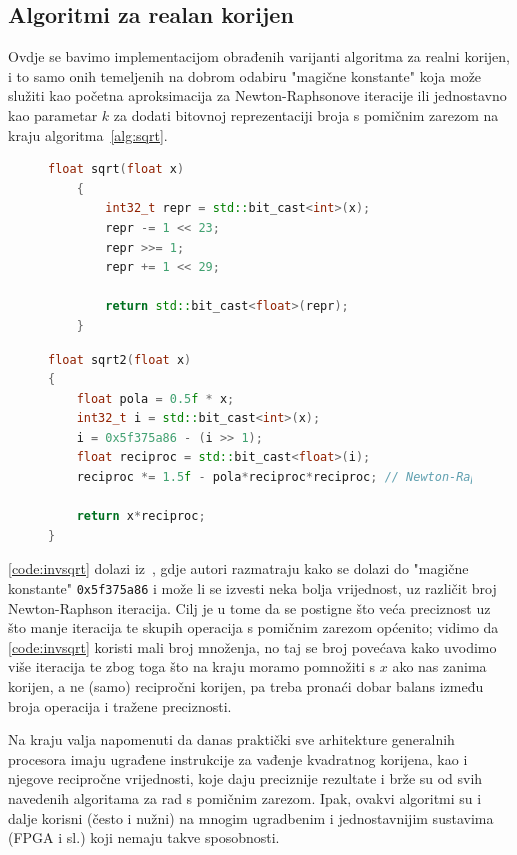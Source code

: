 \documentclass[12pt]{scrartcl}
\begin{document}
\subsection{Algoritmi za realan korijen}
Ovdje se bavimo implementacijom obrađenih varijanti algoritma za realni korijen, i to samo onih temeljenih na dobrom odabiru "magične konstante"
koja može služiti kao početna aproksimacija za Newton-Raphsonove iteracije ili jednostavno kao parametar $k$ za dodati bitovnoj reprezentaciji
broja s pomičnim zarezom na kraju algoritma~\ref{alg:sqrt}.
\begin{figure}[h]
\begin{lstlisting}[language=C++, label=code:sqrt, caption=Direktna aproksimacija realnog korijena u C++20]
    float sqrt(float x)
    {
        int32_t repr = std::bit_cast<int>(x);
        repr -= 1 << 23;
        repr >>= 1;
        repr += 1 << 29;
    
        return std::bit_cast<float>(repr);
    }
\end{lstlisting}
\end{figure}

\begin{figure}[h]
\begin{lstlisting}[language=C++, label=code:invsqrt, caption=Aproksimacija korijena preko recipročne vrijednosti u C++20]
float sqrt2(float x)
{
    float pola = 0.5f * x;
    int32_t i = std::bit_cast<int>(x);
    i = 0x5f375a86 - (i >> 1);
    float reciproc = std::bit_cast<float>(i);
    reciproc *= 1.5f - pola*reciproc*reciproc; // Newton-Raphson iteracija; moguce ponoviti vise puta

    return x*reciproc;
}
\end{lstlisting}
\end{figure}

\autoref{code:invsqrt} dolazi iz~\cite{walczyk2018improving}, gdje autori razmatraju kako se dolazi do "magične konstante"
\verb|0x5f375a86| i može li se izvesti neka bolja vrijednost, uz različit broj Newton-Raphson iteracija. Cilj je u tome da se postigne što
veća preciznost uz što manje iteracija te skupih operacija s pomičnim zarezom općenito; vidimo da \autoref{code:invsqrt} koristi mali
broj množenja, no taj se broj povećava kako uvodimo više iteracija te zbog toga što na kraju moramo pomnožiti s $x$ ako nas zanima korijen, a ne
(samo) recipročni korijen, pa treba pronaći dobar balans između broja operacija i tražene preciznosti.

Na kraju valja napomenuti da danas praktički sve arhitekture generalnih procesora imaju ugrađene instrukcije za vađenje kvadratnog korijena, kao
i njegove recipročne vrijednosti, koje daju preciznije rezultate i brže su od svih navedenih algoritama za rad s pomičnim zarezom. Ipak, ovakvi
algoritmi su i dalje korisni (često i nužni) na mnogim ugradbenim i jednostavnijim sustavima (FPGA i sl.) koji nemaju takve sposobnosti.
\end{document}
